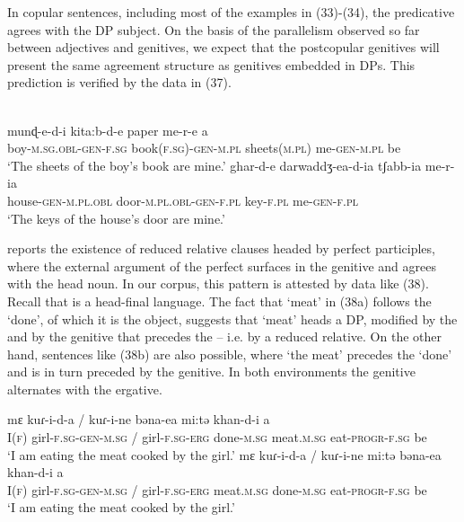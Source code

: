\documentclass[output=paper]{langsci/langscibook}
\begin{document}
In copular sentences, including most of the examples in (33)-(34), the predicative  agrees with the DP subject. On the basis of the parallelism observed so far between adjectives and genitives, we expect that the postcopular genitives will present the same agreement structure as genitives embedded in DPs. This prediction is verified by the data in (37).

\ea%
    \label{ex:manzini:37}\\
    \ea
    \gll munɖ-e-d-i   kita:b-d-e   paper   me-r-e  a \\
         boy-\textsc{m.sg.obl-gen-f.sg}   book\textsc{(f.sg)-gen-m.pl}  sheets\textsc{(m.pl)}  me-\textsc{gen-m.pl}   be \\
    \glt ‘The sheets of the boy’s book are mine.’
    \ex
    \gll ghar-d-e   darwaddʒ-ea-d-ia   tʃabb-ia   me-r-ia\\
         house-\textsc{gen-m.pl.obl}  door-\textsc{m.pl.obl-gen-f.pl}  key-\textsc{f.pl}  me-\textsc{gen-f.pl}    \\
    \glt ‘The keys of the house’s door are mine.’
    \z
\z

\citet[295]{Payne1995} reports the existence of reduced relative clauses headed by perfect participles, where the external argument of the perfect  surfaces in the genitive and agrees with the head noun. In our corpus, this pattern is attested by data like (38). Recall that  is a head-final language. The fact that ‘meat’ in (38a) follows the  ‘done’, of which it is the object, suggests that ‘meat’ heads a DP, modified by the  and by the genitive that precedes the  – i.e. by a reduced relative. On the other hand, sentences like (38b) are also possible, where ‘the meat’ precedes the  ‘done’ and is in turn preceded by the genitive. In both environments the genitive alternates with the ergative.

\ea%
    \label{ex:manzini:38}
    \ea
    \gll mɛ  kuɾ-i-d-a /  kuɾ-i-ne  bəna-ea      mi:tə      khan-d-i   a\\
         I(\textsc{f})  girl-\textsc{f.sg-gen-m.sg} /  girl-\textsc{f.sg-erg}  done-\textsc{m.sg}  meat.\textsc{m.sg}  eat-\textsc{progr-f.sg}  be\\
    \glt ‘I am eating the meat cooked by the girl.’
    \ex
    \gll mɛ  kuɾ-i-d-a /   kuɾ-i-ne   mi:tə  bəna-ea     khan-d-i   a\\
         I(\textsc{f})  girl-\textsc{f.sg-gen-m.sg} /  girl-\textsc{f.sg-erg}   meat.\textsc{m.sg}  done-\textsc{m.sg}   eat-\textsc{progr-f.sg}   be\\
    \glt ‘I am eating the meat cooked by the girl.’
    \z
\z
\end{document}
